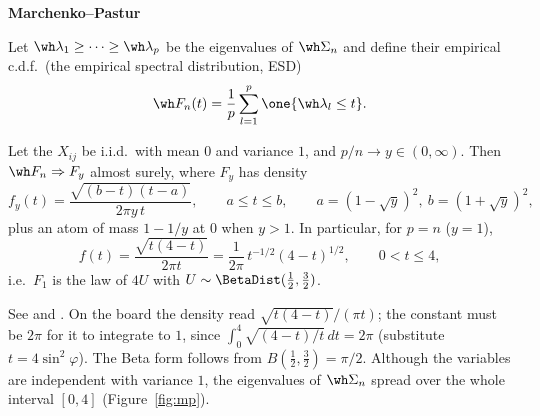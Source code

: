 \textbf{Marchenko--Pastur}

Let \(\wh\lambda_1 \ge \dots \ge \wh\lambda_p\) be the eigenvalues of \(\wh\Sigma_n\) and define their empirical c.d.f.\ (the empirical spectral distribution, ESD)
\[\wh F_n(t) = \frac{1}{p} \sum_{l=1}^p \one\{\wh\lambda_l \le t\}.\]

\begin{theorem}\label{thm:mp}
Let the \(X_{ij}\) be i.i.d.\ with mean \(0\) and variance \(1\), and \(p/n \to y \in (0, \infty)\). Then \(\wh F_n \Rightarrow F_y\) almost surely, where \(F_y\) has density
\[f_y(t) = \frac{\sqrt{(b-t)(t-a)}}{2\pi y\, t}, \qquad a \le t \le b, \qquad a = (1 - \sqrt y)^2,\ b = (1 + \sqrt y)^2,\]
plus an atom of mass \(1 - 1/y\) at \(0\) when \(y > 1\). In particular, for \(p = n\) (\(y = 1\)),
\[f(t) = \frac{\sqrt{t(4-t)}}{2\pi t} = \frac{1}{2\pi}\, t^{-1/2} (4-t)^{1/2}, \qquad 0 < t \le 4,\]
i.e.\ \(F_1\) is the law of \(4U\) with \(U \sim \BetaDist(\tfrac12, \tfrac32)\).
\end{theorem}

See \citet{MP67} and \citet[Ch.~3]{BS10}. On the board the density read \(\sqrt{t(4-t)}/(\pi t)\); the constant must be \(2\pi\) for it to integrate to \(1\), since \(\int_0^4 \sqrt{(4-t)/t}\, dt = 2\pi\) (substitute \(t = 4\sin^2\varphi\)). The Beta form follows from \(B(\tfrac12, \tfrac32) = \pi/2\). Although the variables are independent with variance \(1\), the eigenvalues of \(\wh\Sigma_n\) spread over the whole interval \([0, 4]\) (Figure~\ref{fig:mp}).

